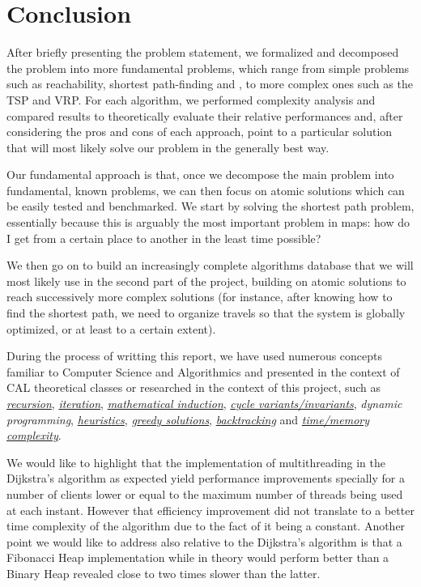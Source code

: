 \chapter{Conclusion} \label{conclusion}
After briefly presenting the problem statement, we formalized and decomposed the problem into more fundamental problems, which range from simple problems such as reachability, shortest path-finding and , to more complex ones such as the \acrshort{TSP} and \acrshort{VRP}. For each algorithm, we performed complexity analysis and compared results to theoretically evaluate their relative performances and, after considering the pros and cons of each approach, point to a particular solution that will most likely solve our problem in the generally best way.\par
Our fundamental approach is that, once we decompose the main problem into fundamental, known problems, we can then focus on atomic solutions which can be easily tested and benchmarked. We start by solving the shortest path problem, essentially because this is arguably the most important problem in maps: how do I get from a certain place to another in the least time possible?\par
We then go on to build an increasingly complete algorithms database that we will most likely use in the second part of the project, building on atomic solutions to reach successively more complex solutions (for instance, after knowing how to find the shortest path, we need to organize travels so that the system is globally optimized, or at least to a certain extent).\par
During the process of writting this report, we have used numerous concepts familiar to Computer Science and Algorithmics and presented in the context of CAL theoretical classes or researched in the context of this project, such as \emph{\hyperref[glsentry-recursive]{recursion}}, \emph{\hyperref[glsentry-iterative]{iteration}}, \emph{\hyperref[teor:dfs]{mathematical induction}}, \emph{\hyperref[sec:dijkstra-PoC]{cycle variants/invariants}}, \emph{\gls{dynamic programming}}, \emph{\hyperref[glsentry-heuristic]{heuristics}}, \emph{\hyperref[glsentry-greedy]{greedy solutions}}, \emph{\hyperref[algorithm-reachability-dfs]{backtracking}} and \emph{\hyperref[complexity-analysis]{time/memory complexity}}.\par

We would like to highlight that the implementation of multithreading in the Dijkstra's algorithm as expected yield performance improvements specially for a number of clients lower or equal to the maximum number of threads being used at each instant. However that efficiency improvement did not translate to a better time complexity of the algorithm due to the fact of it being a constant.
Another point we would like to address also relative to the Dijkstra's algorithm is that a Fibonacci Heap implementation while in theory would perform better than a Binary Heap revealed close to two times slower than the latter.

